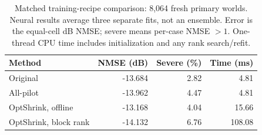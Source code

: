 \begin{table}[!t]
\caption{Matched training-recipe comparison: 8,064 fresh primary worlds. Neural results average three separate fits, not an ensemble. Error is the equal-cell dB NMSE; severe means per-case NMSE $>1$. One-thread CPU time includes initialization and any rank search/refit.}
\label{tab:training}\centering\footnotesize
\setlength{\tabcolsep}{3pt}
\begin{tabular}{@{}lrrr@{}}\toprule
Method & NMSE (dB) & Severe (\%) & Time (ms)\\
\midrule
Original & -13.684 & 2.82 & 4.81\\
All-pilot & -13.962 & 4.47 & 4.81\\
OptShrink, offline & -13.168 & 4.04 & 15.66\\
OptShrink, block rank & -14.132 & 6.76 & 108.08\\
\bottomrule
\end{tabular}
\end{table}
